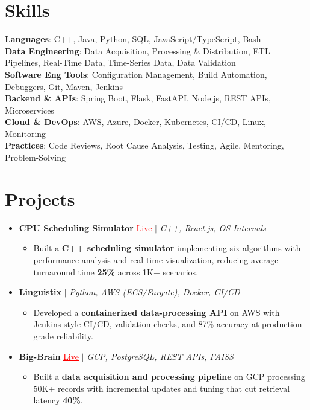 \documentclass[letterpaper,10pt]{article}
\newcommand{\resumeItem}[1]{\item\small{{#1 \vspace{-2pt}}}}
\newcommand{\resumeProjectHeading}[1]{\item \small #1 \vspace{-2pt}}
\newcommand{\resumeSubHeadingListStart}{\begin{itemize}[leftmargin=0.0in, label={}]}
\newcommand{\resumeSubHeadingListEnd}{\end{itemize}}
\newcommand{\resumeProjItemListStart}{\begin{itemize}[leftmargin=0.15in,label=\textbullet,itemsep=0pt,topsep=0pt,parsep=0pt,partopsep=0pt]}
\newcommand{\resumeProjItemListEnd}{\end{itemize}\vspace{-4pt}}
\begin{document}
\section{Skills}
\begin{itemize}[leftmargin=0.15in, label={}]
\small{\item{
\textbf{Languages}: C++, Java, Python, SQL, JavaScript/TypeScript, Bash \\
\textbf{Data Engineering}: Data Acquisition, Processing \& Distribution, ETL Pipelines, Real-Time Data, Time-Series Data, Data Validation \\
\textbf{Software Eng Tools}: Configuration Management, Build Automation, Debuggers, Git, Maven, Jenkins \\
\textbf{Backend \& APIs}: Spring Boot, Flask, FastAPI, Node.js, REST APIs, Microservices \\
\textbf{Cloud \& DevOps}: AWS, Azure, Docker, Kubernetes, CI/CD, Linux, Monitoring \\
\textbf{Practices}: Code Reviews, Root Cause Analysis, Testing, Agile, Mentoring, Problem-Solving
}}
\end{itemize}
\vspace{-6pt}
\section{Projects}
\resumeSubHeadingListStart
\vspace{-2pt}
\resumeProjectHeading{\textbf{CPU Scheduling Simulator} {\href{https://cpu-scheduler-amber.vercel.app/}{\textcolor{red}{\underline{Live}}}} $|$ \emph{C++, React.js, OS Internals}}
\resumeProjItemListStart
\resumeItem{Built a \textbf{C++ scheduling simulator} implementing six algorithms with performance analysis and real-time visualization, reducing average turnaround time \textbf{25\%} across 1K+ scenarios.}
\resumeProjItemListEnd
\vspace{3pt}
\resumeProjectHeading{\textbf{Linguistix} $|$ \emph{Python, AWS (ECS/Fargate), Docker, CI/CD}}
\resumeProjItemListStart
\resumeItem{Developed a \textbf{containerized data-processing API} on AWS with Jenkins-style CI/CD, validation checks, and 87\% accuracy at production-grade reliability.}
\resumeProjItemListEnd
\vspace{3pt}
\resumeProjectHeading{\textbf{Big-Brain} {\href{https://big-brain-pied.vercel.app/}{\textcolor{red}{\underline{Live}}}} $|$ \emph{GCP, PostgreSQL, REST APIs, FAISS}}
\resumeProjItemListStart
\resumeItem{Built a \textbf{data acquisition and processing pipeline} on GCP processing 50K+ records with incremental updates and tuning that cut retrieval latency \textbf{40\%}.}
\resumeProjItemListEnd
\resumeSubHeadingListEnd
\end{document}

